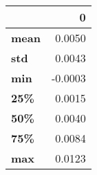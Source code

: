 \begin{tabular}{lr}
\toprule
{} &       0 \\
\midrule
\textbf{mean} &  0.0050 \\
\textbf{std } &  0.0043 \\
\textbf{min } & -0.0003 \\
\textbf{25\% } &  0.0015 \\
\textbf{50\% } &  0.0040 \\
\textbf{75\% } &  0.0084 \\
\textbf{max } &  0.0123 \\
\bottomrule
\end{tabular}
